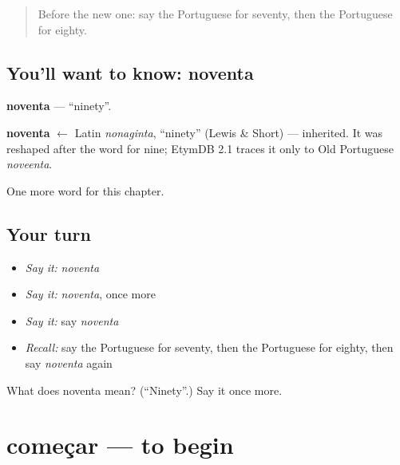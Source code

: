 \label{lesson:PT-C130-noventa}



\begin{quote}
Before the new one: say the Portuguese for seventy, then the Portuguese for eighty.
\end{quote}

\subsection*{You'll want to know: noventa}
\textbf{noventa} — \textquotedblleft{}ninety\textquotedblright{}.

\begin{cousinweb}
\textbf{noventa} $\leftarrow$ Latin \emph{nonaginta}, \textquotedblleft{}ninety\textquotedblright{} (Lewis \& Short) — inherited. It was reshaped after the word for nine; EtymDB 2.1 traces it only to Old Portuguese \emph{noveenta}.
\end{cousinweb}

\begin{grammarlens}[title={What you've built}]
One more word for this chapter.
\end{grammarlens}

\subsection*{Your turn}
\begin{itemize}
\raggedright
  \item \emph{Say it:} \emph{noventa}
  \item \emph{Say it:} \emph{noventa}, once more
  \item \emph{Say it:} say \emph{noventa}
  \item \emph{Recall:} say the Portuguese for seventy, then the Portuguese for eighty, then say \emph{noventa} again
\end{itemize}

\begin{tcolorbox}[breakable,colback=teal!4,colframe=teal!35!black,title={Before you move on}]
What does noventa mean? (\textquotedblleft{}Ninety\textquotedblright{}.) Say it once more.
\end{tcolorbox}
\section[começar]{começar — to begin}

\label{lesson:PT-C130-comecar}



